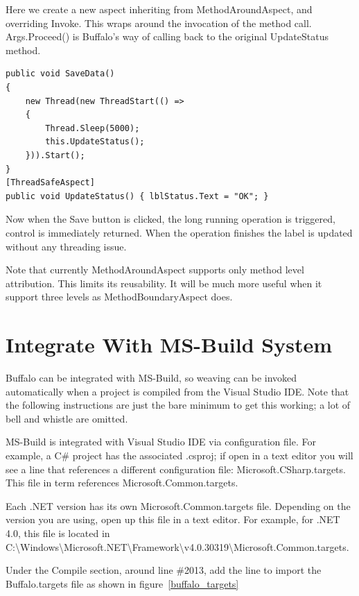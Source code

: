 Here we create a new aspect inheriting from MethodAroundAspect, and overriding Invoke. This wraps around the invocation of the method call. Args.Proceed() is Buffalo’s way of calling back to the original UpdateStatus method.

\begin{lstlisting}[caption={Apply ThreadSafeAspect}, label=savedata5, frame=tb, basicstyle=\scriptsize]
public void SaveData()
{
	new Thread(new ThreadStart(() =>
	{
		Thread.Sleep(5000);
		this.UpdateStatus();
	})).Start();
}
[ThreadSafeAspect]
public void UpdateStatus() { lblStatus.Text = "OK"; }
\end{lstlisting}

Now when the Save button is clicked, the long running operation is triggered, control is immediately returned. When the operation finishes the label is updated without any threading issue.

Note that currently MethodAroundAspect supports only method level attribution. This limits its reusability. It will be much more useful when it support three levels as MethodBoundaryAspect does.


\section{Integrate With MS-Build System}

Buffalo can be integrated with MS-Build, so weaving can be invoked automatically when a project is compiled from the Visual Studio IDE. Note that the following instructions are just the bare minimum to get this working; a lot of bell and whistle are omitted.

MS-Build is integrated with Visual Studio IDE via configuration file. For example, a C\# project has the associated .csproj; if open in a text editor you will see a line that references a different configuration file: Microsoft.CSharp.targets. This file in term references Microsoft.Common.targets.

Each .NET version has its own Microsoft.Common.targets file. Depending on the version you are using, open up this file in a text editor. For example, for .NET 4.0, this file is located in C:\textbackslash Windows\textbackslash Microsoft.NET\textbackslash Framework\textbackslash v4.0.30319\textbackslash Microsoft.Common.targets.

Under the Compile section, around line \#2013, add the line to import the Buffalo.targets file as shown in figure~\ref{buffalo_targets}

